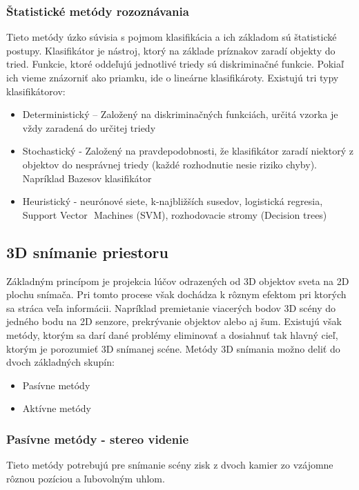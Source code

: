 \subsubsection{Štatistické metódy rozoznávania}
Tieto metódy úzko súvisia s pojmom klasifikácia a ich základom sú štatistické postupy. Klasifikátor je nástroj, ktorý na základe príznakov zaradí objekty do tried. Funkcie, ktoré oddeľujú jednotlivé triedy sú diskriminačné funkcie. Pokiaľ ich vieme znázorniť ako priamku, ide o lineárne klasifikároty. Existujú tri typy klasifikátorov: 

\begin{itemize}
\item Deterministický  – Založený na diskriminačných funkciách, určitá vzorka je vždy zaradená do určitej triedy 
\item Stochastický -  Založený na pravdepodobnosti, že klasifikátor zaradí niektorý z objektov do nesprávnej triedy (každé rozhodnutie nesie riziko chyby).  Napríklad Bazesov klasifikátor
\item Heuristický - neurónové siete, k-najbližších susedov, logistická regresia, Support Vector  Machines (SVM), rozhodovacie stromy (Decision trees) 
\end{itemize}

\subsection{3D snímanie priestoru}
Základným princípom je projekcia lúčov odrazených od 3D objektov sveta na 2D plochu snímača. Pri tomto procese však dochádza k rôznym efektom pri ktorých sa stráca veľa informácii. Napríklad premietanie viacerých bodov 3D scény do jedného bodu na 2D senzore, prekrývanie objektov alebo aj šum. Existujú však metódy, ktorým sa darí dané problémy eliminovať a dosiahnuť tak  hlavný cieľ, ktorým je porozumieť 3D snímanej scéne. Metódy 3D snímania možno deliť do dvoch základných skupín: 

\begin{itemize}
\item Pasívne metódy
\item Aktívne metódy 
\end{itemize}

\subsubsection{Pasívne metódy - stereo videnie}
Tieto metódy potrebujú pre snímanie scény zisk z dvoch kamier zo vzájomne rôznou pozíciou a ľubovolným uhlom. 

